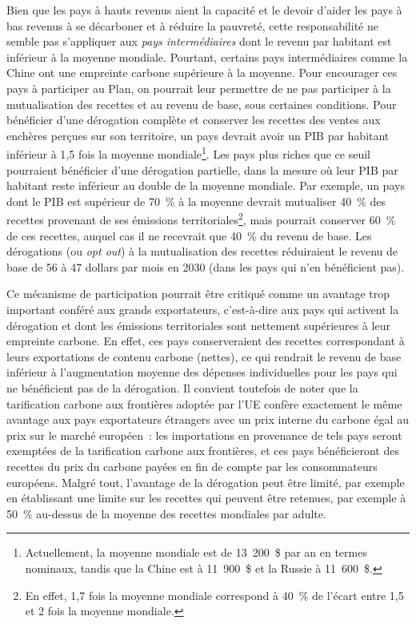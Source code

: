 \documentclass[a5paper,french,openany]{memoir}
\begin{document}
Bien que les pays à hauts revenus aient la capacité et le devoir d'aider les pays à bas revenus à se décarboner et à réduire la pauvreté, cette responsabilité ne semble pas s'appliquer aux \textit{pays intermédiaires} dont le revenu par habitant est inférieur à la moyenne mondiale. Pourtant, certains pays intermédiaires comme la Chine ont une empreinte carbone supérieure à la moyenne. Pour encourager ces pays à participer au Plan, on pourrait leur permettre de ne pas participer à la mutualisation des recettes et au revenu de base, sous certaines conditions. Pour bénéficier d'une dérogation complète et conserver les recettes des ventes aux enchères perçues sur son territoire, un pays devrait avoir un PIB par habitant inférieur à 1,5 fois la moyenne mondiale\footnote{Actuellement, la moyenne mondiale est de 13~200~\$ par an en termes nominaux, tandis que la Chine est à 11~900~\$ et la Russie à 11~600~\$.}. 
Les pays plus riches que ce seuil pourraient bénéficier d'une dérogation partielle, dans la mesure où leur PIB par habitant reste inférieur au double de la moyenne mondiale. Par exemple, un pays dont le PIB est supérieur de 70~\% à la moyenne devrait mutualiser 40~\% des recettes provenant de ses émissions territoriales\footnote{En effet, 1,7 fois la moyenne mondiale correspond à 40~\% de l'écart entre 1,5 et 2 fois la moyenne mondiale.}, mais pourrait conserver 60~\% de ces recettes, auquel cas il ne recevrait que 40~\% du revenu de base. Les dérogations (ou \textit{opt out}) à la mutualisation des recettes réduiraient le revenu de base de 56 à 47 dollars par mois en 2030 (dans les pays qui n'en bénéficient pas). 

Ce mécanisme de participation pourrait être critiqué comme un avantage trop important conféré aux grands exportateurs, c'est-à-dire aux pays qui activent la dérogation et dont les émissions territoriales sont nettement supérieures à leur empreinte carbone. En effet, ces pays conserveraient des recettes correspondant à leurs exportations de contenu carbone (nettes), ce qui rendrait le revenu de base inférieur à l'augmentation moyenne des dépenses individuelles pour les pays qui ne bénéficient pas de la dérogation. Il convient toutefois de noter que la tarification carbone aux frontières adoptée par l'UE confère exactement le même avantage aux pays exportateurs étrangers avec un prix interne du carbone égal au prix sur le marché européen~: les importations en provenance de tels pays seront exemptées de la tarification carbone aux frontières, et ces pays bénéficieront des recettes du prix du carbone payées en fin de compte par les consommateurs européens. Malgré tout, l'avantage de la dérogation peut être limité, par exemple en établissant une limite sur les recettes qui peuvent être retenues, par exemple à 50~\% au-dessus de la moyenne des recettes mondiales par adulte. %
\end{document}
